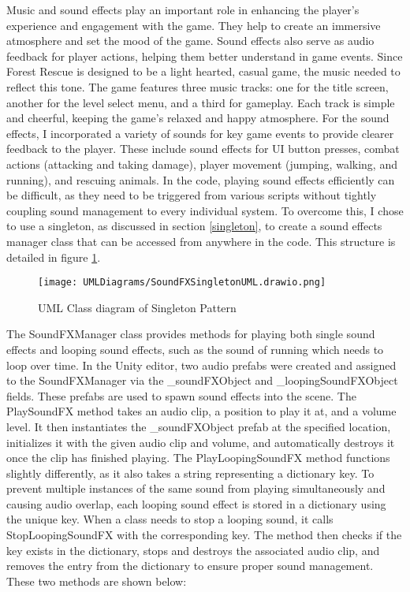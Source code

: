 \documentclass[10pt]{final_report}
\begin{document}
Music and sound effects play an important role in enhancing the player's experience and engagement with the game. They help to create an immersive atmosphere and set the mood of the game. Sound effects also serve as audio feedback for player actions, helping them better understand in game events. Since Forest Rescue is designed to be a light hearted, casual game, the music needed to reflect this tone. The game features three music tracks: one for the title screen, another for the level select menu, and a third for gameplay. Each track is simple and cheerful, keeping the game's relaxed and happy atmosphere. For the sound effects, I incorporated a variety of sounds for key game events to provide clearer feedback to the player. These include sound effects for UI button presses, combat actions (attacking and taking damage), player movement (jumping, walking, and running), and rescuing animals. 
\newline
In the code, playing sound effects efficiently can be difficult, as they need to be triggered from various scripts without tightly coupling sound management to every individual system. To overcome this, I chose to use a singleton, as discussed in section \ref{singleton}, to create a sound effects manager class that can be accessed from anywhere in the code. This structure is detailed in figure \ref{fig:label_singletonSoundFX}.
\begin{figure}[H]
    \centering
    \texttt{[image: UMLDiagrams/SoundFXSingletonUML.drawio.png]}
    \caption{UML Class diagram of Singleton Pattern}
    \label{fig:label_singletonSoundFX}
\end{figure}

The SoundFXManager class provides methods for playing both single sound effects and looping sound effects, such as the sound of running which needs to loop over time. In the Unity editor, two audio prefabs were created and assigned to the SoundFXManager via the \_soundFXObject and \_loopingSoundFXObject fields. These prefabs are used to spawn sound effects into the scene. The PlaySoundFX method takes an audio clip, a position to play it at, and a volume level. It then instantiates the \_soundFXObject prefab at the specified location, initializes it with the given audio clip and volume, and automatically destroys it once the clip has finished playing. The PlayLoopingSoundFX method functions slightly differently, as it also takes a string representing a dictionary key. To prevent multiple instances of the same sound from playing simultaneously and causing audio overlap, each looping sound effect is stored in a dictionary using the unique key. When a class needs to stop a looping sound, it calls StopLoopingSoundFX with the corresponding key. The method then checks if the key exists in the dictionary, stops and destroys the associated audio clip, and removes the entry from the dictionary to ensure proper sound management. These two methods are shown below:
\end{document}
